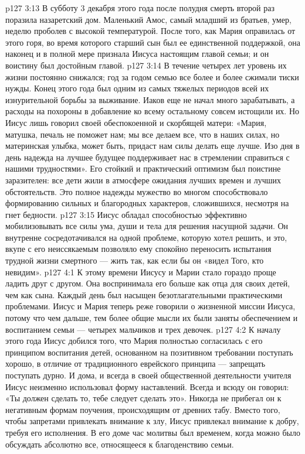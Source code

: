 \vs p127 3:13 \pc В субботу 3 декабря этого года после полудня смерть второй раз поразила назаретский дом. Маленький Амос, самый младший из братьев, умер, неделю проболев с высокой температурой. После того, как Мария оправилась от этого горя, во время которого старший сын был ее единственной поддержкой, она наконец и в полной мере признала Иисуса настоящим главой семьи; и он воистину был достойным главой.
\vs p127 3:14 В течение четырех лет уровень их жизни постоянно снижался; год за годом семью все более и более сжимали тиски нужды. Конец этого года был одним из самых тяжелых периодов всей их изнурительной борьбы за выживание. Иаков еще не начал много зарабатывать, а расходы на похороны в добавление ко всему остальному совсем истощили их. Но Иисус лишь говорил своей обеспокоенной и скорбящей матери: «Мария, матушка, печаль не поможет нам; мы все делаем все, что в наших силах, но материнская улыбка, может быть, придаст нам силы делать еще лучше. Изо дня в день надежда на лучшее будущее поддерживает нас в стремлении справиться с нашими трудностями». Его стойкий и практический оптимизм был поистине заразителен: все дети жили в атмосфере ожидания лучших времен и лучших обстоятельств. Это полное надежды мужество во многом способствовало формированию сильных и благородных характеров, сложившихся, несмотря на гнет бедности.
\vs p127 3:15 Иисус обладал способностью эффективно мобилизовывать все силы ума, души и тела для решения насущной задачи. Он внутренне сосредотачивался на одной проблеме, которую хотел решить, и это, вкупе с его неиссякаемым  позволяло ему спокойно переносить испытания трудной жизни смертного --- жить так, как если бы он «видел Того, кто невидим».
\vs p127 4:1 К этому времени Иисусу и Марии стало гораздо проще ладить друг с другом. Она воспринимала его больше как отца для своих детей, чем как сына. Каждый день был насыщен безотлагательными практическими проблемами. Иисус и Мария теперь реже говорили о жизненной миссии Иисуса, потому что чем дальше, тем более общие мысли их были заняты обеспечением и воспитанием семьи --- четырех мальчиков и трех девочек.
\vs p127 4:2 К началу этого года Иисус добился того, что Мария полностью согласилась с его принципом воспитания детей, основанном на позитивном требовании поступать хорошо, в отличие от традиционного еврейского принципа --- запрещать поступать дурно. И дома, и всегда в своей общественной деятельности учителя Иисус неизменно использовал  форму наставлений. Всегда и всюду он говорил: «Ты должен сделать то, тебе следует сделать это». Никогда не прибегал он к негативным формам поучения, происходящим от древних табу. Вместо того, чтобы запретами привлекать внимание к злу, Иисус привлекал внимание к добру, требуя его исполнения. В его доме час молитвы был временем, когда можно было обсуждать абсолютно все, относящееся к благоденствию семьи.
